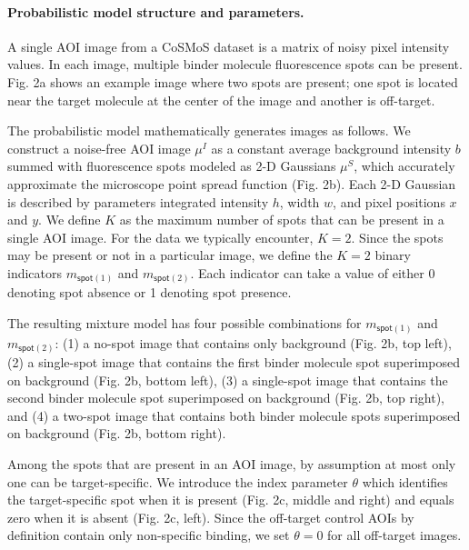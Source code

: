 
\paragraph{Probabilistic model structure and parameters.} %
A single AOI image from a CoSMoS dataset is a matrix of noisy pixel intensity values.  In each image, multiple binder molecule fluorescence spots can be present. Fig. 2a shows an example image where two spots are present; one spot is located near the target molecule at the center of the image and another is off-target. 

The probabilistic model mathematically generates images as follows.  We construct a noise-free AOI image $\mu^I$ as a constant average background intensity $b$ summed with fluorescence spots modeled as 2-D Gaussians $\mu^S$, which accurately approximate the microscope point spread function \cite{Zhang2007-rb} (Fig. 2b). Each 2-D Gaussian is described by parameters integrated intensity $h$, width $w$, and pixel positions $x$ and $y$. We define $K$ as the maximum number of spots that can be present in a single AOI image.  For the data we typically encounter, $K = 2$. Since the spots may be present or not in a particular image, we define the $K = 2$ binary indicators $m_{\mathsf{spot}(1)}$ and $m_{\mathsf{spot}(2)}$.  Each indicator can take a value of either 0 denoting spot absence or 1 denoting spot presence. 

The resulting mixture model has four possible combinations for $m_{\mathsf{spot}(1)}$ and $m_{\mathsf{spot}(2)}$: (1) a no-spot image that contains only background (Fig. 2b, top left), (2) a single-spot image that contains the first binder molecule spot superimposed on background (Fig. 2b, bottom left), (3) a single-spot image that contains the second binder molecule spot superimposed on background (Fig. 2b, top right), and (4) a two-spot image that contains both binder molecule spots superimposed on background (Fig. 2b, bottom right).

Among the spots that are present in an AOI image, by assumption at most only one can be target-specific. We introduce the index parameter $\theta$ which identifies the target-specific spot  when it is present (Fig. 2c, middle and right) and equals zero when it is absent (Fig. 2c, left). Since the off-target control AOIs by definition contain only non-specific binding, we set $\theta = 0$ for all off-target images. 

